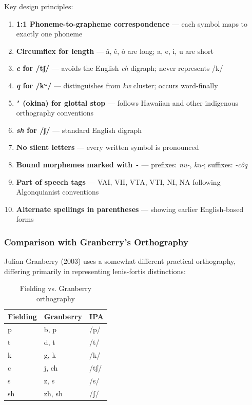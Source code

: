 Key design principles:
\begin{enumerate}
  \item \textbf{1:1 Phoneme-to-grapheme correspondence} --- each symbol maps
    to exactly one phoneme
  \item \textbf{Circumflex for length} --- â, ê, ô are long; a, e, i, u are
    short
  \item \textbf{\textit{c} for /tʃ/} --- avoids the English \textit{ch}
    digraph; never represents /k/
  \item \textbf{\textit{q} for /kʷ/} --- distinguishes from \textit{kw}
    cluster; occurs word-finally
  \item \textbf{\texttt{'} (okina) for glottal stop} --- follows Hawaiian and
    other indigenous orthography conventions
  \item \textbf{\textit{sh} for /ʃ/} --- standard English digraph
  \item \textbf{No silent letters} --- every written symbol is pronounced
  \item \textbf{Bound morphemes marked with \texttt{-}} --- prefixes:
    \textit{nu-}, \textit{ku-}; suffixes: \textit{-côq}
  \item \textbf{Part of speech tags} --- VAI, VII, VTA, VTI, NI, NA following
    Algonquianist conventions
  \item \textbf{Alternate spellings in parentheses} --- showing earlier
    English-based forms
\end{enumerate}

\subsubsection{Comparison with Granberry's Orthography}

Julian Granberry (2003) uses a somewhat different practical orthography,
differing primarily in representing lenis-fortis distinctions:

\begin{table}[h]
\centering
\begin{tabular}{lll}
\toprule
Fielding & Granberry & IPA \\
\midrule
p & b, p & /p/ \\
t & d, t & /t/ \\
k & g, k & /k/ \\
c & j, ch & /tʃ/ \\
s & z, s & /s/ \\
sh & zh, sh & /ʃ/ \\
\bottomrule
\end{tabular}
\caption{Fielding vs. Granberry orthography}
\label{tab:1364-granberry}
\end{table}

